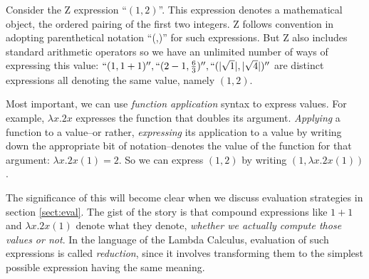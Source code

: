 \documentclass[12pt]{tufte-handout}
\numberwithin{equation}{subsection}
\numberwithin{equation}{subsection}
\begin{document}
Consider the Z expression ``\((1,2)\)''.  This expression denotes a
mathematical object, the ordered pairing of the first two integers.  Z
follows convention in adopting parenthetical notation ``(,)'' for such
expressions.  But Z also includes standard arithmetic operators so we
have an unlimited number of ways of expressing this value:
\(``(1,1+1)'', ``(2-1,\frac{6}{3})'', ``(|\sqrt{1}|,|\sqrt{4}|)''\)
are distinct expressions all denoting the same value, namely
\((1,2)\).

Most important, we can use \textit{function application} syntax to
express values.  For example, \(\lambda x.2x\) expresses the function
that doubles its argument.  \textit{Applying} a function to a
value--or rather, \textit{expressing} its application to a value by
writing down the appropriate bit of notation--denotes the value of the
function for that argument: \(\lambda x.2x(1) = 2\).  So we can
express \((1,2)\) by writing \((1,\lambda x.2x(1))\).

The significance of this will become clear when we discuss evaluation
strategies in section \ref{sect:eval}.  The gist of the story is that
compound expressions like \(1+1\) and \(\lambda x.2x(1)\) denote what
they denote, \textit{whether we actually compute those values or not}.
In the language of the Lambda Calculus, evaluation of such expressions
is called \textit{reduction}, since it involves transforming them to
the simplest possible expression having the same
meaning.
\end{document}
